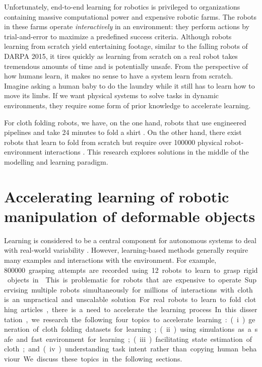 \documentclass[\home/main.tex]{subfiles}
\begin{document}
Unfortunately, end-to-end learning for robotics is privileged to organizations containing massive computational power and expensive robotic farms. The robots in these farms operate \emph{interactively} in an environment: they perform actions by trial-and-error to maximize a predefined success criteria. Although robots learning from scratch yield entertaining footage, similar to the falling robots of DARPA 2015, it tires quickly as learning from scratch on a real robot takes tremendous amounts of time and is potentially unsafe. From the perspective of how humans learn, it makes no sense to have a system learn from scratch. Imagine asking a human baby to do the laundry while it still has to learn how to move its limbs. If we want physical systems to solve tasks in dynamic environments, they require some form of prior knowledge to accelerate learning.

For cloth folding robots, we have, on the one hand, robots that use engineered pipelines and take 24 minutes to fold a shirt \autocite{Maitin2010}. On the other hand, there exist robots that learn to fold from scratch but require over \qty{100000}{} physical robot-environment interactions \autocite{Matas2018}. This research explores solutions in the middle of the modelling and learning paradigm.



\section{Accelerating learning of robotic manipulation of deformable objects} \label{sec:intro_acc_learning}
Learning is considered to be a central component for autonomous systems to deal with real-world variability \autocite{kroemer2021review}. However, learning-based methods generally require many examples and interactions with the environment. For example, \qty{800000} grasping attempts are recorded using \qty{12} robots to learn to grasp rigid objects in \autocite{Levine2018}. This is problematic for robots that are expensive to operate. Supervising multiple robots simultaneously for millions of interactions with cloth is an unpractical and unscalable solution. For real robots to learn to fold clothing articles, there is a need to accelerate the learning process. In this dissertation, we research the following four topics to accelerate learning:
(i) generation of cloth folding datasets for learning;
(ii) using simulations as a safe and fast environment for learning;
(iii) facilitating state estimation of cloth; and
(iv) understanding task intent rather than copying human behaviour.
We discuss these topics in the following sections.
\end{document}
